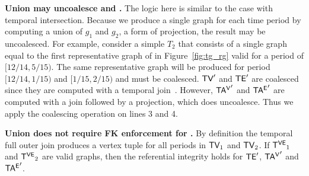 
{\bf Union may uncoalesce \tve and \trg.}  The logic here is similar
to the case with temporal intersection.  Because we produce a single
graph for each time period by computing a union of $g_1$ and $g_2$, a
form of projection, the result may be uncoalesced.  For example,
consider a simple \tg $T_2$ that consists of a single graph equal to
the first representative graph of  in Figure~\ref{fig:tg_rg}
valid for a period of $[12/14, 5/15)$.  The same representative graph
  will be produced for period $[12/14, 1/15)$ and $[1/15, 2/15)$ and
      must be coalesced.  $\textsf{TV}'$ and $\textsf{TE}'$ are coalesced since they
      are computed with a temporal
      join~\cite{DBLP:conf/vldb/BohlenSS96}.  However, $\mathsf{TA^{V}}'$ and
      $\mathsf{TA^{E}}'$ are computed with a join followed by a projection, which
      does uncoalesce.  Thus we apply the coalescing operation on
      lines 3 and 4.

{\bf Union does not require FK enforcement for \tve.}  By definition
the temporal full outer join produces a vertex tuple for all periods
in $\textsf{TV}_1$ and $\textsf{TV}_2$.  If $\mathsf{T^{VE}}_1$ and $\mathsf{T^{VE}}_2$ are valid graphs,
then the referential integrity holds for $\textsf{TE}'$, $\mathsf{TA^{V}}'$ and $\mathsf{TA^{E}}'$.


